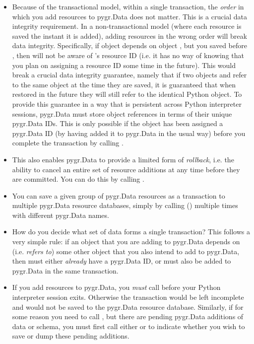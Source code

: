 \documentclass{howto}
\begin{document}
\begin{itemize}
\item Because of the transactional model,
within a single transaction, the {\em order} in which you
add resources to pygr.Data does not matter.  This is a crucial data
integrity requirement.  In a non-transactional model (where each
resource is saved the instant it is added), adding resources in the
wrong order will break data integrity.  Specifically, 
if object  depends on object , 
but you saved  before , then
 will not be aware of 's resource ID (i.e. it has no way of
knowing that you plan on assigning  a resource ID some time
in the future).  This would break a crucial data integrity guarantee,
namely that if two objects  and  refer to the same
object  at the time they are saved, it is guaranteed that
when restored in the future they will still refer to the identical
Python object.  To provide this guarantee in a way that is
persistent across Python interpreter sessions, pygr.Data must 
store object references in terms of their unique pygr.Data IDs.
This is only possible if the object has been assigned a pygr.Data
ID (by having added it to pygr.Data in the usual way) before
you complete the transaction by calling .

\item This also enables pygr.Data to provide a limited form of
{\em rollback}, i.e. the ability to cancel an entire set of
resource additions at any time before they are committed.
You can do this by calling .

\item You can save a given group of pygr.Data resources as a transaction
to multiple pygr.Data resource databases, simply by calling
() multiple times with different
pygr.Data  names.

\item How do you decide what set of data forms a single transaction?
This follows a very simple rule: if an object  that you are adding
to pygr.Data depends on (i.e. {\em refers
to}) some other object  that you also
intend to add to pygr.Data, then  must either {\em already} have a pygr.Data ID,
or  must also be added to pygr.Data in the same transaction.

\item If you add resources to pygr.Data, you {\em must} call 
before your Python interpreter session exits.  Otherwise the transaction would
be left incomplete and would not be saved to the pygr.Data resource database.
Similarly, if for some reason you need to call , 
but there are pending pygr.Data additions of data or schema, you must
first call either  or 
to indicate whether you wish to save or dump these pending additions.

\end{itemize}
\end{document}
